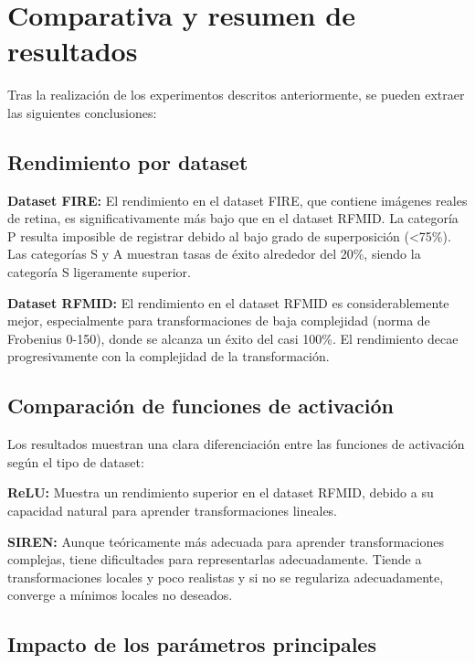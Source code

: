 \section{Comparativa y resumen de resultados}
\label{sec:Comparativa e resumo}

Tras la realización de los experimentos descritos anteriormente, se pueden extraer las siguientes conclusiones:

\subsection{Rendimiento por dataset}
\label{subsec:Rendemento por dataset}

\textbf{Dataset FIRE:} El rendimiento en el dataset FIRE, que contiene imágenes reales de retina, es significativamente más bajo que en el dataset RFMID. La categoría P resulta imposible de registrar debido al bajo grado de superposición (<75\%). Las categorías S y A muestran tasas de éxito alrededor del 20\%, siendo la categoría S ligeramente superior.

\textbf{Dataset RFMID:} El rendimiento en el dataset RFMID es considerablemente mejor, especialmente para transformaciones de baja complejidad (norma de Frobenius 0-150), donde se alcanza un éxito del casi 100\%. El rendimiento decae progresivamente con la complejidad de la transformación.

\subsection{Comparación de funciones de activación}
\label{subsec:Comparación de funcións de activación}

Los resultados muestran una clara diferenciación entre las funciones de activación según el tipo de dataset:

\textbf{ReLU:} Muestra un rendimiento superior en el dataset RFMID, debido a su capacidad natural para aprender transformaciones lineales.

\textbf{SIREN:} Aunque teóricamente más adecuada para aprender transformaciones complejas, tiene dificultades para representarlas adecuadamente. Tiende a transformaciones locales y poco realistas y si no se regulariza adecuadamente, converge a mínimos locales no deseados.

\subsection{Impacto de los parámetros principales}
\label{subsec:Impacto dos parámetros principais}

